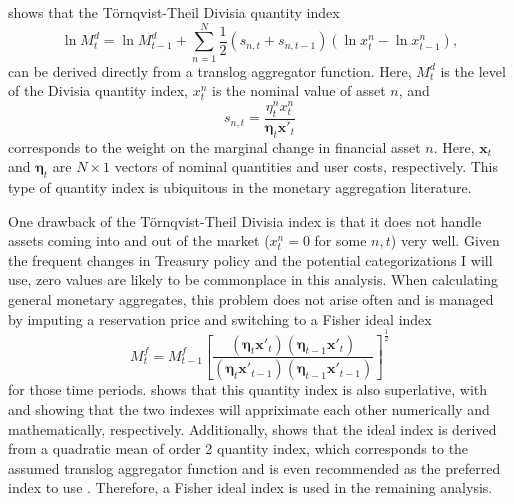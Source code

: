 \documentclass[11pt,a4paper,margin=1.5in]{article}
\begin{document}
\citet[][Section 2]{Diewert:1976} shows that the T\"{o}rnqvist-Theil Divisia quantity index 
\begin{equation*}
	\ln{M^d_t} = \ln{M^d_{t-1}} + \sum_{n=1}^{N}\frac{1}{2}(s_{n,t}+s_{n,t-1})\left(\ln{x^n_{t}} - \ln{x^n_{t-1}}\right),
	\label{DI}
\end{equation*}
can be derived directly from a translog aggregator function.
Here, $M^d_t$ is the level of the Divisia quantity index, $x^n_{t}$ is the nominal value of asset $n$, and 
\begin{equation*}
	s_{n,t}  = \frac{\eta^n_{t}x^n_{t}}{\boldsymbol \eta_t \mathbf{x'}_t}
\end{equation*}
corresponds to the weight on the marginal change in financial asset $n$.
Here, $\mathbf{x}_t$ and $\boldsymbol \eta_t$ are $N \times 1$ vectors of nominal quantities and user costs, respectively.
This type of quantity index is ubiquitous in the monetary aggregation literature.

One drawback of the T\"{o}rnqvist-Theil Divisia index is that it does not handle assets coming into and out of the market ($x^n_{t} = 0$ for some $n,t$) very well.
Given the frequent changes in Treasury policy and the potential categorizations I will use, zero values are likely to be commonplace in this analysis.
When calculating general monetary aggregates, this problem does not arise often and is managed by imputing a reservation price and switching to a Fisher ideal index 
\begin{equation}
	M^f_t = M^f_{t-1}\left[\frac{(\boldsymbol \eta_t \mathbf{x'}_t) (\boldsymbol \eta_{t-1} \mathbf{x'}_t)}{(\boldsymbol \eta_t \mathbf{x'}_{t-1}) (\boldsymbol \eta_{t-1} \mathbf{x'}_{t-1})}\right]^{\frac{1}{2}}
	\label{eq:FisherIdeal}
\end{equation}
for those time periods.
\citet{Diewert:1976} shows that this quantity index is also superlative, with \citet{Diewert:1978} and \citet{Dumagan:2002} showing that the two indexes will appriximate each other numerically and mathematically, respectively.
Additionally, \citet{Diewert:1976} shows that the ideal index is derived from a quadratic mean of order 2 quantity index, which corresponds to the assumed translog aggregator function and is even recommended as the preferred index to use \citep[][Section 5]{Diewert:1976}.
Therefore, a Fisher ideal index is used in the remaining analysis.
\end{document}

